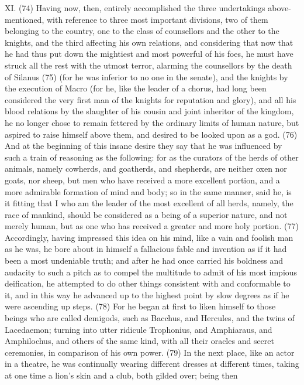 XI. (74) Having now, then, entirely accomplished the three undertakings above-mentioned, with
reference to three most important divisions, two of them belonging to the country, one to the class
of counsellors and the other to the knights, and the third affecting his own relations, and
considering that now that he had thus put down the mightiest and most powerful of his foes, he
must have struck all the rest with the utmost terror, alarming the counsellors by the death of Silanus
(75) (for he was inferior to no one in the senate), and the knights by the execution of Macro (for
he, like the leader of a chorus, had long been considered the very first man of the knights for
reputation and glory), and all his blood relations by the slaughter of his cousin and joint inheritor of
the kingdom, he no longer chose to remain fettered by the ordinary limits of human nature, but
aspired to raise himself above them, and desired to be looked upon as a god. (76) And at the
beginning of this insane desire they say that he was influenced by such a train of reasoning as the
following: for as the curators of the herds of other animals, namely cowherds, and goatherds, and
shepherds, are neither oxen nor goats, nor sheep, but men who have received a more excellent
portion, and a more admirable formation of mind and body; so in the same manner, said he, is it
fitting that I who am the leader of the most excellent of all herds, namely, the race of mankind,
should be considered as a being of a superior nature, and not merely human, but as one who has
received a greater and more holy portion. (77) Accordingly, having impressed this idea on his
mind, like a vain and foolish man as he was, he bore about in himself a fallacious fable and
invention as if it had been a most undeniable truth; and after he had once carried his boldness and
audacity to such a pitch as to compel the multitude to admit of his most impious deification, he
attempted to do other things consistent with and conformable to it, and in this way he advanced up
to the highest point by slow degrees as if he were ascending up steps. (78) For he began at first to
liken himself to those beings who are called demigods, such as Bacchus, and Hercules, and the
twins of Lacedaemon; turning into utter ridicule Trophonius, and Amphiaraus, and Amphilochus,
and others of the same kind, with all their oracles and secret ceremonies, in comparison of his own
power. (79) In the next place, like an actor in a theatre, he was continually wearing different
dresses at different times, taking at one time a lion's skin and a club, both gilded over; being then
